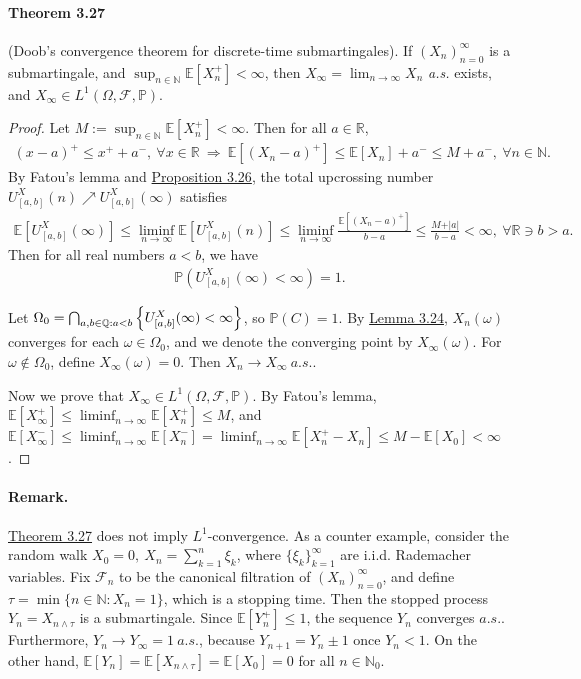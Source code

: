 \documentclass{article}
\numberwithin{equation}{section}
\newcommand{\E}{\mathbb{E}}
\renewcommand{\P}{\mathbb{P}}
\theoremstyle{plain}
\theoremstyle{definition}
\begin{document}
\paragraph{Theorem 3.27\label{thm:3.27}} (Doob's convergence theorem for discrete-time submartingales). If $(X_n)_{n=0}^\infty$ is a submartingale, and $\sup_{n\in\mathbb{N}}\E[X_n^+]<\infty$, then $X_\infty=\lim_{n\to\infty}X_n$ \textit{a.s.} exists, and $X_\infty\in L^1(\Omega,\mathscr{F},\P)$.
\begin{proof}
Let $M:=\sup_{n\in\mathbb{N}}\E[X_n^+]<\infty$. Then for all $a\in\mathbb{R}$,
\begin{align*}
	(x-a)^+\leq x^+ + a^-,\ \forall x\in\mathbb{R}\ \Rightarrow\ \E[(X_n-a)^+]\leq \E[X_n]+a^- \leq M+a^-,\ \forall n\in\mathbb{N}.
\end{align*}
By Fatou's lemma and \hyperref[prop:3.26]{Proposition 3.26}, the total upcrossing number $U_{[a,b]}^X(n)\nearrow U_{[a,b]}^X(\infty)$ satisfies
\begin{align*}
	\E\left[U_{[a,b]}^X(\infty)\right] \leq\liminf_{n\to\infty}\E\left[U_{[a,b]}^X(n)\right]\leq\liminf_{n\to\infty}\frac{\E[(X_n-a)^+]}{b-a}\leq \frac{M+\vert a\vert}{b-a}<\infty,\ \forall \mathbb{R}\ni b>a.
\end{align*}
Then for all real numbers $a<b$, we have
\begin{align*}
	\P\left(U_{[a,b]}^X(\infty)<\infty\right) = 1.
\end{align*}

Let $\Omega_0=\bigcap_{a,b\in\mathbb{Q}:a<b}\left\{U_{[a,b]}^X(\infty)<\infty\right\}\vspace{0.1cm}$, so $\P(C)=1$. By \hyperref[lemma:3.24]{Lemma 3.24}, $X_n(\omega)$ converges for each $\omega\in\Omega_0$, and we denote the converging point by $X_\infty(\omega)$. For $\omega\notin\Omega_0$, define $X_\infty(\omega)=0$. Then $X_n\to X_\infty\ a.s.$.

Now we prove that $X_\infty\in L^1(\Omega,\mathscr{F},\P)$. By Fatou's lemma, $\E[X_\infty^+]\leq\liminf_{n\to\infty}\E[X_n^+]\leq M$, and $\E[X_\infty^-]\leq\liminf_{n\to\infty}\E[X_n^-]=\liminf_{n\to\infty}\E[X_n^+ -X_n]\leq M-\E[X_0]<\infty$.
\end{proof}

\paragraph{Remark.} \hyperref[thm:3.27]{Theorem 3.27} does not imply $L^1$-convergence. As a counter example, consider the random walk $X_0=0,\ X_n=\sum_{k=1}^n\xi_k$, where $\{\xi_k\}_{k=1}^\infty$ are i.i.d. Rademacher variables. Fix $\mathscr{F}_n$ to be the canonical filtration of $(X_n)_{n=0}^\infty$, and define $\tau=\min\{n\in\mathbb{N}:X_n=1\}$, which is a stopping time. Then the stopped process $Y_n=X_{n\wedge\tau}$ is a submartingale. Since $\E[Y_n^+]\leq 1$, the sequence $Y_n$ converges $a.s.$. Furthermore, $Y_n\to Y_\infty=1\ a.s.$, because $Y_{n+1}=Y_n\pm 1$ once $Y_n<1$. On the other hand, $\E[Y_n]=\E[X_{n\wedge\tau}]=\E[X_0]=0$ for all $n\in\mathbb{N}_0$.
\end{document}
